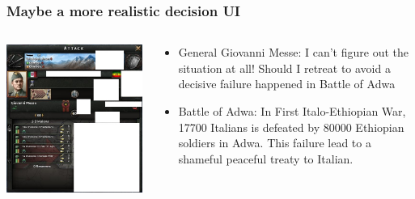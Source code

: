 \documentclass{beamer}
\begin{document}
\begin{frame}

    \frametitle{Maybe a more realistic decision UI }
    
    \begin{columns}[T]
        \begin{column}{.5\textwidth}
                \includegraphics[width=\textwidth]{hoi4_hidden.jpg}
        \end{column}        
        \begin{column}{.5\textwidth}

    \begin{itemize}

    \item General Giovanni Messe:
    I can't figure out the situation at all! Should I retreat to avoid a decisive failure happened in  Battle of Adwa
    \item Battle of Adwa:
    In First Italo-Ethiopian War, 17700 Italians is defeated by 80000 Ethiopian soldiers in Adwa. This failure lead to a shameful peaceful treaty to Italian.

    \end{itemize}
    
    \end{column}
\end{columns}
    
\end{frame}
    
\end{document}

